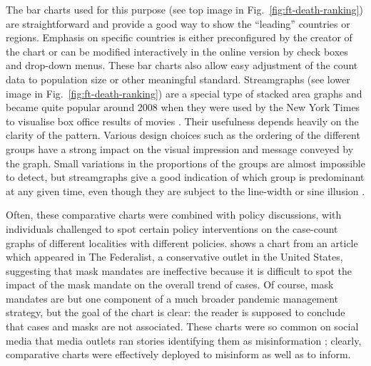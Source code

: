 \documentclass[article]{jdssv}\usepackage[]{graphicx}\usepackage[]{color}
\begin{document}
The bar charts used for this purpose (see top image in Fig.~\ref{fig:ft-death-ranking}) are straightforward and provide a good way to show the ``leading'' countries or regions. Emphasis on specific countries is either preconfigured by the creator of the chart or can be modified interactively in the online version by check boxes and drop-down menus. These bar charts also allow easy adjustment of the count data to population size or other meaningful standard. Streamgraphs (see lower image in Fig.~\ref{fig:ft-death-ranking}) are a special type of stacked area graphs and became quite popular around 2008 when they were used by the New York Times to visualise box office results of movies \citep{streamgraph}. Their usefulness depends heavily on the clarity of the pattern. Various design choices such as the ordering of the different groups have a strong impact on the visual impression and message conveyed by the graph. Small variations in the proportions of the groups are almost impossible to detect, but streamgraphs give a good indication of which group is predominant at any given time, even though they are subject to the line-width or sine illusion \citep{vanderplasSignsSineIllusion2015}. 

Often, these comparative charts were combined with policy discussions, with individuals challenged to spot certain policy interventions on the case-count graphs of different localities with different policies\citep{weissThese12Graphs2020}.  shows a chart from an article which appeared in The Federalist, a conservative outlet in the United States, suggesting that mask mandates are ineffective because it is difficult to spot the impact of the mask mandate on the overall trend of cases. Of course, mask mandates are but one component of a much broader pandemic management strategy, but the goal of the chart is clear: the reader is supposed to conclude that cases and masks are not associated. These charts were so common on social media that media outlets ran stories identifying them as misinformation \citep{reutersstaffFactCheckMask2020}; clearly, comparative charts were effectively deployed to misinform as well as to inform.
\end{document}
